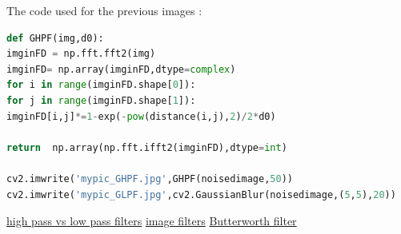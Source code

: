 \documentclass{article}
\begin{document}
The code used for the previous images : 
\begin{lstlisting}[language=Python]
def GHPF(img,d0):
imginFD = np.fft.fft2(img)
imginFD= np.array(imginFD,dtype=complex)
for i in range(imginFD.shape[0]):
for j in range(imginFD.shape[1]):
imginFD[i,j]*=1-exp(-pow(distance(i,j),2)/2*d0)

return  np.array(np.fft.ifft2(imginFD),dtype=int)

cv2.imwrite('mypic_GHPF.jpg',GHPF(noisedimage,50))
cv2.imwrite('mypic_GLPF.jpg',cv2.GaussianBlur(noisedimage,(5,5),20))
\end{lstlisting}
\begin{thebibliography}{9}
	\href{http://www.tutorialspoint.com/dip/high_pass_vs_low_pass_filters.htm}{high pass vs low pass filters}
	\href{http://paulbourke.net/miscellaneous/imagefilter/}{image filters}
	\href{https://en.wikipedia.org/wiki/Butterworth_filter}{Butterworth filter}
	
	
\end{thebibliography}
\end{document}

